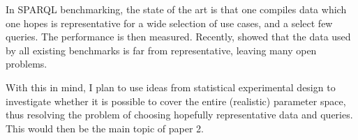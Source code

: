 \documentclass[a4paper,english,10pt]{article}
\begin{document}
In SPARQL benchmarking, the state of the art is that one compiles data
which one hopes is representative for a wide selection of use cases,
and a select few queries. The performance is then measured. Recently,
\cite{Duan:2011:AOC:1989323.1989340} showed that the data used by all
existing benchmarks is far from representative, leaving many open
problems.

With this in mind, I plan to use ideas from statistical experimental
design to investigate whether it is possible to cover the entire
(realistic) parameter space, thus resolving the problem of choosing
hopefully representative data and queries. This would then be the main
topic of paper 2.
\end{document}
